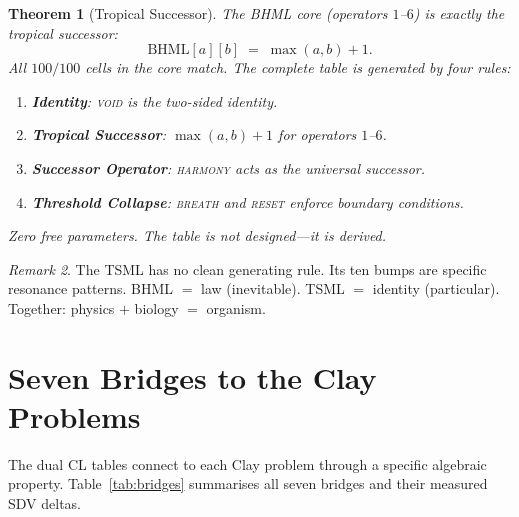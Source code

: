 \documentclass[12pt, openany]{book}
\newtheorem{theorem}{Theorem}[chapter]
\theoremstyle{remark}
\newtheorem{remark}[theorem]{Remark}
\begin{document}
\begin{theorem}[Tropical Successor]
\label{thm:tropical-successor}
The BHML core (operators $1$--$6$) is exactly the tropical successor:
\[
  \mathrm{BHML}[a][b] \;=\; \max(a,b) + 1.
\]
All $100/100$ cells in the core match.  The complete table is generated by four
rules:
\begin{enumerate}
  \item \textbf{Identity}: \textsc{void} is the two-sided identity.
  \item \textbf{Tropical Successor}: $\max(a,b)+1$ for operators $1$--$6$.
  \item \textbf{Successor Operator}: \textsc{harmony} acts as the universal
        successor.
  \item \textbf{Threshold Collapse}: \textsc{breath} and \textsc{reset} enforce
        boundary conditions.
\end{enumerate}
Zero free parameters.  The table is not designed---it is derived.
\end{theorem}

\begin{remark}
The TSML has no clean generating rule.  Its ten bumps are specific resonance
patterns.  BHML $=$ law (inevitable).  TSML $=$ identity (particular).
Together: physics $+$ biology $=$ organism.
\end{remark}

\section{Seven Bridges to the Clay Problems}
\label{sec:seven-bridges}

The dual CL tables connect to each Clay problem through a specific algebraic
property.  Table~\ref{tab:bridges} summarises all seven bridges and their
measured SDV deltas.
\end{document}
